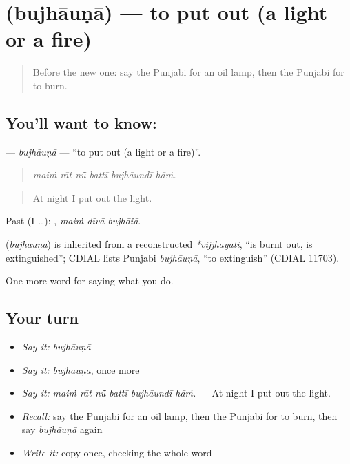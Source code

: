 \section[\texorpdfstring{\pa{ਬੁਝਾਉਣਾ} (bujhāuṇā)}{ਬੁਝਾਉਣਾ (bujhāuṇā)}]{ (bujhāuṇā) — to put out (a light or a fire)}

\label{lesson:PA-C234-bujhauna}



\begin{quote}
Before the new one: say the Punjabi for an oil lamp, then the Punjabi for to burn.
\end{quote}

\subsection*{You'll want to know: }
\textbf{} — \emph{bujhāuṇā} — \textquotedblleft{}to put out (a light or a fire)\textquotedblright{}.

\begin{quote}
     
\end{quote}

\begin{quote}
\emph{maiṁ rāt nū̃ battī bujhāundī hāṁ.}
\end{quote}

\begin{quote}
At night I put out the light.
\end{quote}

Past (I …):   , \emph{maiṁ dīvā bujhāiā}.

\begin{cousinweb}
\textbf{} (\emph{bujhāuṇā}) is inherited from a reconstructed \emph{*vijjhāyati}, \textquotedblleft{}is burnt out, is extinguished\textquotedblright{}; CDIAL lists Punjabi \emph{bujhāuṇā}, \textquotedblleft{}to extinguish\textquotedblright{} (CDIAL 11703).
\end{cousinweb}

\begin{grammarlens}[title={What you've built}]
One more word for saying what you do.
\end{grammarlens}

\subsection*{Your turn}
\begin{itemize}
\raggedright
  \item \emph{Say it:} \emph{bujhāuṇā}
  \item \emph{Say it:} \emph{bujhāuṇā}, once more
  \item \emph{Say it:} \emph{maiṁ rāt nū̃ battī bujhāundī hāṁ.} — At night I put out the light.
  \item \emph{Recall:} say the Punjabi for an oil lamp, then the Punjabi for to burn, then say \emph{bujhāuṇā} again
  \item \emph{Write it:} copy \textbf{} once, checking the whole word
\end{itemize}

